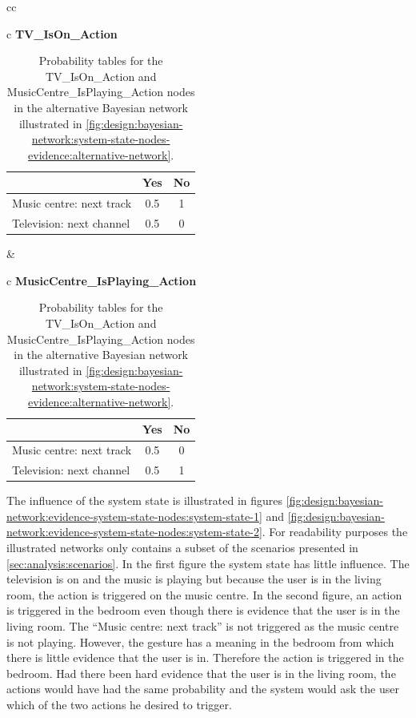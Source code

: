\begin{table}[h!]
\centering
\caption{Probability tables for the TV\_IsOn\_Action and MusicCentre\_IsPlaying\_Action nodes in the alternative Bayesian network illustrated in \cref{fig:design:bayesian-network:system-state-nodes-evidence:alternative-network}.}
\label{tbl:design:bayesian-network:system-state-nodes-evidence:alternative-system-state}
\begin{tabular}{cc}
\begin{tabular}{c}
\textbf{TV\_IsOn\_Action}   \\
\begin{tabular}{l|cc}
~ & Yes   & No \\ \hline
Music centre: next track & 0.5 & 1 \\
Television: next channel & 0.5 & 0
\end{tabular}
\end{tabular}
&
\begin{tabular}{c}
\textbf{MusicCentre\_IsPlaying\_Action}   \\
\begin{tabular}{l|cc}
~ & Yes   & No \\ \hline
Music centre: next track & 0.5 & 0 \\
Television: next channel & 0.5 & 1
\end{tabular}
\end{tabular}
\end{tabular}
\end{table}

The influence of the system state is illustrated in figures \ref{fig:design:bayesian-network:evidence-system-state-nodes:system-state-1} and \ref{fig:design:bayesian-network:evidence-system-state-nodes:system-state-2}. For readability purposes the illustrated networks only contains a subset of the scenarios presented in \cref{sec:analysis:scenarios}. In the first figure the system state has little influence. The television is on and the music is playing but because the user is in the living room, the action is triggered on the music centre. In the second figure, an action is triggered in the bedroom even though there is evidence that the user is in the living room. The ``Music centre: next track'' is not triggered as the music centre is not playing. However, the gesture has a meaning in the bedroom from which there is little evidence that the user is in. Therefore the action is triggered in the bedroom. Had there been hard evidence that the user is in the living room, the actions would have had the same probability and the system would ask the user which of the two actions he desired to trigger.

